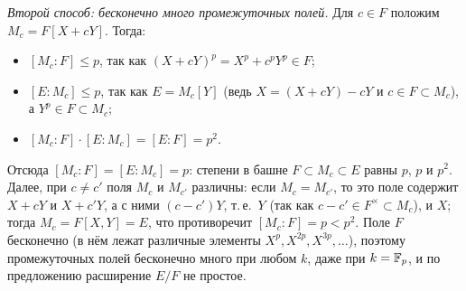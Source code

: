 \begin{example}[5.5]
\emph{Второй способ: бесконечно много промежуточных полей.} Для $c\in F$ положим $M_c=F[X+cY]$. Тогда:
\begin{itemize}[leftmargin=*]
\item $[M_c:F]\le p$, так как $(X+cY)^p=X^p+c^pY^p\in F$;
\item $[E:M_c]\le p$, так как $E=M_c[Y]$ (ведь $X=(X+cY)-cY$ и $c\in F\subset M_c$), а $Y^p\in F\subset M_c$;
\item $[M_c:F]\cdot[E:M_c]=[E:F]=p^2$.
\end{itemize}
Отсюда $[M_c:F]=[E:M_c]=p$: степени в башне $F\subset M_c\subset E$ равны $p$, $p$ и $p^2$. Далее, при $c\ne c'$ поля
$M_c$ и $M_{c'}$ различны: если $M_c=M_{c'}$, то это поле содержит $X+cY$ и $X+c'Y$, а с ними $(c-c')Y$, т.\,е.\ $Y$
(так как $c-c'\in F^\times\subset M_c$), и $X$; тогда $M_c=F[X,Y]=E$, что противоречит $[M_c:F]=p<p^2$. Поле $F$
бесконечно (в нём лежат различные элементы $X^p,X^{2p},X^{3p},\dots$), поэтому промежуточных полей бесконечно много при
любом $k$, даже при $k=\mathbb F_p$, и по предложению  расширение $E/F$ не простое.
\begin{keepfig}
\begin{center}
\end{center}
\end{keepfig}
\end{example}
